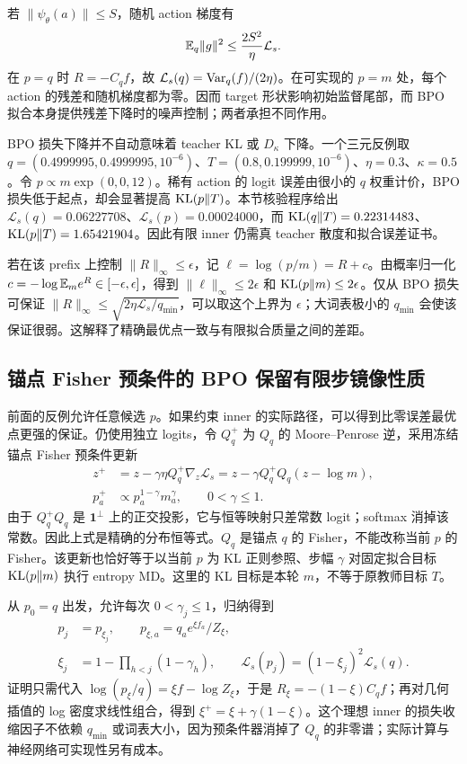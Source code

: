 若 $\|\psi_\theta(a)\|\le S$，随机 action 梯度有
\begin{equation}
 \mathbb E_q\|g\|^2\le\frac{2S^2}{\eta}\mathcal L_s.
\end{equation}
在 $p=q$ 时 $R=-C_qf$，故 $\mathcal L_s(q)=\operatorname{Var}_q(f)/(2\eta)$。在可实现的 $p=m$ 处，每个 action 的残差和随机梯度都为零。因而 target 形状影响初始监督尾部，而 BPO 拟合本身提供残差下降时的噪声控制；两者承担不同作用。

BPO 损失下降并不自动意味着 teacher KL 或 $D_\kappa$ 下降。一个三元反例取 $q=(0.4999995,0.4999995,10^{-6})$、$T=(0.8,0.199999,10^{-6})$、$\eta=0.3$、$\kappa=0.5$。令 $p\propto m\exp(0,0,12)$。稀有 action 的 logit 误差由很小的 $q$ 权重计价，BPO 损失低于起点，却会显著提高 $\operatorname{KL}(p\Vert T)$。本节核验程序给出 $\mathcal L_s(q)=0.06227708$、$\mathcal L_s(p)=0.00024000$，而 $\operatorname{KL}(q\Vert T)=0.22314483$、$\operatorname{KL}(p\Vert T)=1.65421904$。因此有限 inner 仍需真 teacher 散度和拟合误差证书。

若在该 prefix 上控制 $\|R\|_\infty\le\epsilon$，记 $\ell=\log(p/m)=R+c$。由概率归一化 $c=-\log\mathbb E_me^R\in[-\epsilon,\epsilon]$，得到 $\|\ell\|_\infty\le2\epsilon$ 和 $\operatorname{KL}(p\Vert m)\le2\epsilon$。仅从 BPO 损失可保证 $\|R\|_\infty\le\sqrt{2\eta\mathcal L_s/q_{\min}}$，可以取这个上界为 $\epsilon$；大词表极小的 $q_{\min}$ 会使该保证很弱。这解释了精确最优点一致与有限拟合质量之间的差距。
\subsection{锚点 Fisher 预条件的 BPO 保留有限步镜像性质}

前面的反例允许任意候选 $p$。如果约束 inner 的实际路径，可以得到比零误差最优点更强的保证。仍使用独立 logits，令 $Q_q^+$ 为 $Q_q$ 的 Moore--Penrose 逆，采用冻结锚点 Fisher 预条件更新
\begin{align}
 z^+&=z-\gamma\eta Q_q^+\nabla_z\mathcal L_s
     =z-\gamma Q_q^+Q_q(z-\log m),\\
 p^+_a&\propto p_a^{1-\gamma}m_a^\gamma,\qquad 0<\gamma\le1.
 \label{eq:power-bpo-anchor-fisher-step}
\end{align}
由于 $Q_q^+Q_q$ 是 $\boldsymbol1^\perp$ 上的正交投影，它与恒等映射只差常数 logit；softmax 消掉该常数。因此上式是精确的分布恒等式。$Q_q$ 是锚点 $q$ 的 Fisher，不能改称当前 $p$ 的 Fisher。该更新也恰好等于以当前 $p$ 为 KL 正则参照、步幅 $\gamma$ 对固定拟合目标 $\operatorname{KL}(p\Vert m)$ 执行 entropy MD。这里的 KL 目标是本轮 $m$，不等于原教师目标 $T$。

从 $p_0=q$ 出发，允许每次 $0<\gamma_j\le1$，归纳得到
\begin{align}
 p_j&=p_{\xi_j},\qquad
 p_{\xi,a}=q_ae^{\xi f_a}/Z_\xi,\\
 \xi_j&=1-\prod_{h<j}(1-\gamma_h),\qquad
 \mathcal L_s(p_j)=(1-\xi_j)^2\mathcal L_s(q).
 \label{eq:power-bpo-finite-inner-path}
\end{align}
证明只需代入 $\log(p_\xi/q)=\xi f-\log Z_\xi$，于是 $R_\xi=-(1-\xi)C_qf$；再对几何插值的 log 密度求线性组合，得到 $\xi^+=\xi+\gamma(1-\xi)$。这个理想 inner 的损失收缩因子不依赖 $q_{\min}$ 或词表大小，因为预条件器消掉了 $Q_q$ 的非零谱；实际计算与神经网络可实现性另有成本。

